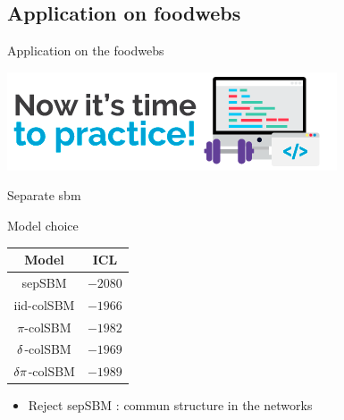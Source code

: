 \documentclass[compress,10pt]{beamer}
\begin{document}
\subsection{Application on foodwebs}
\begin{frame}{Application on the foodwebs}


\begin{center}
\includegraphics[width=0.5 \textwidth]{plots/PRACTICE-TIME}
\end{center}

   
Separate sbm
\end{frame}


\begin{frame}{Model choice}


\centering
\begin{tabular}{|c|c|}
\hline
Model & ICL \\
\hline
sepSBM & $-2080$\\
iid-colSBM& $-1966$ \\
$\pi$-colSBM &$-1982$ \\
$\delta$-colSBM & $-1969$\\
$\delta\pi$-colSBM&$-1989$ \\
\hline
\end{tabular}

\begin{itemize}
 \item Reject sepSBM : commun structure in the networks
\end{itemize}




\end{frame}
\end{document}
